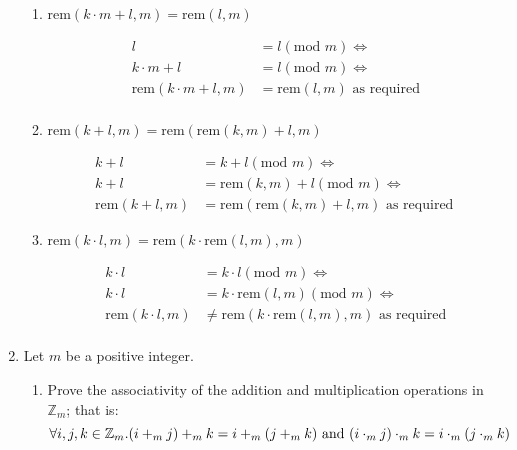 \documentclass[10pt,\jkfside,a4paper]{article}
\begin{document}
\begin{enumerate}
\begin{enumerate}

\item $\text{rem}(k \cdot m + l, m) = \text{rem}(l, m)$

\begin{equation}
\begin{split}
l &= l(\text{mod }m)\Longleftrightarrow\\
k\cdot m + l &= l(\text{mod } m)\Longleftrightarrow\\
\text{rem}(k\cdot m + l, m) &= \text{rem}(l,m)\text{ as required}\\
\end{split}
\end{equation}

\item $\text{rem}(k + l, m) = \text{rem}(\text{rem}(k,m) + l, m)$

\begin{equation}
\begin{split}
k + l &= k + l (\text{mod } m)\Longleftrightarrow\\
k + l &= \text{rem}(k,m) + l (\text{mod } m)\Longleftrightarrow\\
\text{rem}(k + l, m) &= \text{rem}(\text{rem}(k,m) + l, m)\text{ as required}\
\end{split}
\end{equation}

\item $\text{rem}(k \cdot l, m) = \text{rem}(k \cdot \text{rem}(l, m), m)$

\begin{equation}
\begin{split}
k\cdot l &= k\cdot l(\text{mod }m)\Longleftrightarrow\\
k \cdot l &= k\cdot \text{rem}(l, m) (\text{mod } m)\Longleftrightarrow\\
\text{rem}(k \cdot l, m) &\neq \text{rem}(k \cdot \text{rem}(l, m), m)\text{ as required}\\
\end{split}
\end{equation}

\end{enumerate}

\item Let $m$ be a positive integer.

\begin{enumerate}

\item Prove the associativity of the addition and multiplication operations in $\mathbb{Z}_m$; that is:
\begin{equation}
\forall i, j, k \in \mathbb{Z}_m. (i+_mj)+_mk=i+_m(j+_mk)\text{ and }(i\cdot_mj)\cdot_mk=i\cdot_m(j\cdot_mk)\\
\end{equation}


\end{enumerate}
\end{enumerate}
\end{document}
